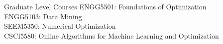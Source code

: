\begin{rSection}{Graduate Level Courses}
    ENGG5501: Foundations of Optimization \\ 
    ENGG5103: Data Mining \\
    SEEM5350: Numerical Optimization \\
    CSCI5580: Online Algorithms for Machine Learning and Optimization
\end{rSection}
